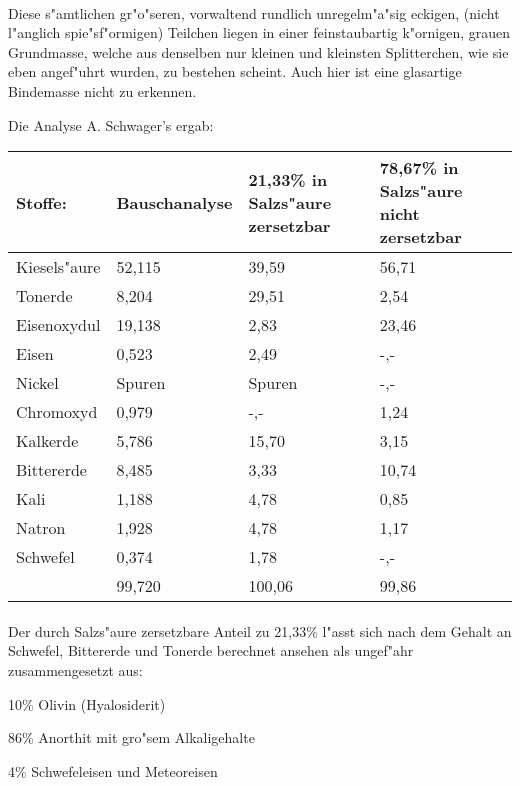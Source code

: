 \documentclass[a4paper, 11pt, oneside]{article}
\begin{document}
\paragraph{}
Diese s"amtlichen gr"o"seren, vorwaltend rundlich unregelm"a"sig eckigen, (nicht l"anglich spie"sf"ormigen) Teilchen liegen in einer feinstaubartig k"ornigen, grauen Grundmasse, welche aus denselben nur kleinen und kleinsten Splitterchen, wie sie eben angef"uhrt wurden, zu bestehen scheint. Auch hier ist eine glasartige Bindemasse nicht zu erkennen.

Die Analyse A. Schwager's ergab:
\begin{center}
\begin{tabular}{ |p{20mm}|p{22mm}|p{32mm}|p{32mm}| }
    \hline
    Stoffe: & Bauschanalyse & 21,33\% in Salzs"aure zersetzbar & 78,67\% in Salzs"aure nicht zersetzbar\\
    \hline\hline
    Kiesels"aure & 52,115 & 39,59 & 56,71\\\hline
    Tonerde & 8,204 & 29,51 & 2,54\\\hline
    Eisenoxydul & 19,138 & 2,83 & 23,46\\\hline
    Eisen & 0,523 & 2,49 & -,-\\\hline
    Nickel & Spuren & Spuren & -,-\\\hline
    Chromoxyd & 0,979 & -,- & 1,24\\\hline
    Kalkerde & 5,786 & 15,70 & 3,15\\\hline
    Bittererde & 8,485 & 3,33 & 10,74\\\hline
    Kali & 1,188 & 4,78 & 0,85\\\hline
    Natron & 1,928 & 4,78 & 1,17\\\hline
    Schwefel & 0,374 & 1,78 & -,-\\\hline
    & 99,720 & 100,06 & 99,86\\
    \hline
\end{tabular}
\end{center}
\paragraph{}
Der durch Salzs"aure zersetzbare Anteil zu 21,33\% l"asst sich nach dem Gehalt an Schwefel, Bittererde und Tonerde berechnet ansehen als ungef"ahr zusammengesetzt aus:

10\% Olivin (Hyalosiderit)

86\% Anorthit mit gro"sem Alkaligehalte

4\% Schwefeleisen und Meteoreisen
\end{document}
